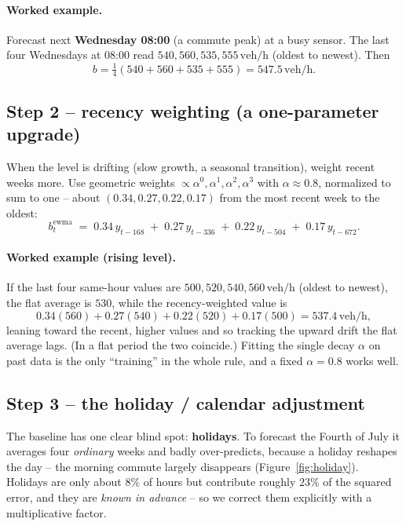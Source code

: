 \documentclass[11pt]{article}
\newcommand{\veh}{\,\text{veh/h}}
\begin{document}
\paragraph{Worked example.} Forecast next \textbf{Wednesday 08:00} (a commute peak)
at a busy sensor. The last four Wednesdays at 08:00 read $540, 560, 535, 555\veh$
(oldest to newest). Then
\[
b = \tfrac14(540+560+535+555) = \mathbf{547.5}\veh.
\]

\subsection{Step 2 -- recency weighting (a one-parameter upgrade)}

When the level is drifting (slow growth, a seasonal transition), weight recent weeks
more. Use geometric weights $\propto \alpha^{0},\alpha^{1},\alpha^{2},\alpha^{3}$
with $\alpha \approx 0.8$, normalized to sum to one -- about
$(0.34, 0.27, 0.22, 0.17)$ from the most recent week to the oldest:
\begin{equation}
b_t^{\text{ewma}} \;=\; 0.34\,y_{t-168} \;+\; 0.27\,y_{t-336} \;+\; 0.22\,y_{t-504}
\;+\; 0.17\,y_{t-672}.
\end{equation}

\paragraph{Worked example (rising level).} If the last four same-hour values are
$500, 520, 540, 560\veh$ (oldest to newest), the flat average is $530$, while the
recency-weighted value is
\[
0.34(560)+0.27(540)+0.22(520)+0.17(500) = \mathbf{537.4}\veh,
\]
leaning toward the recent, higher values and so tracking the upward drift the flat
average lags. (In a flat period the two coincide.) Fitting the single decay
$\alpha$ on past data is the only ``training'' in the whole rule, and a fixed
$\alpha=0.8$ works well.

\subsection{Step 3 -- the holiday / calendar adjustment}

The baseline has one clear blind spot: \textbf{holidays}. To forecast the Fourth of
July it averages four \emph{ordinary} weeks and badly over-predicts, because a
holiday reshapes the day -- the morning commute largely disappears
(Figure~\ref{fig:holiday}). Holidays are only about $8\%$ of hours but contribute
roughly $23\%$ of the squared error, and they are \emph{known in advance} -- so we
correct them explicitly with a multiplicative factor.
\end{document}
